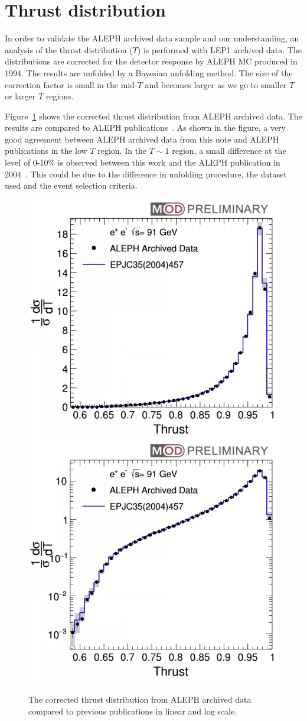 \section{Thrust distribution}

In order to validate the ALEPH archived data sample and our understanding,
an analysis of the thrust distribution ($T$) is performed with LEP1 archived
data. The distributions are corrected for the detector response by ALEPH MC
produced in 1994. The results are unfolded by a Bayesian unfolding method. The size of the correction factor is small in the mid-$T$
and becomes larger as we go to smaller $T$ or larger $T$ regions.


Figure~\ref{fig:ThrustResults} shows the corrected thrust distribution from ALEPH archived data. The results are compared to ALEPH
publications~\cite{Barate:1996fi,heister:2003aj}. As shown in the figure, a very good agreement between ALEPH archived data from this note
and ALEPH publications in the low $T$ region. In the $T\sim 1$ region, a small difference at the level of 0-10\% is observed between this work
and the ALEPH publication in 2004~\cite{heister:2003aj}. This could be due to the difference in unfolding procedure, the dataset used and the event selection criteria.


\begin{figure}[H]
\centering
\includegraphics[width=.49\textwidth]{images/Thrust/ThrustResult.png}
\includegraphics[width=.49\textwidth]{images/Thrust/ThrustResultLogY.png}
\caption{The corrected thrust distribution from ALEPH archived data compared to previous publications in linear and log scale.}
\label{fig:ThrustResults}
\end{figure}
